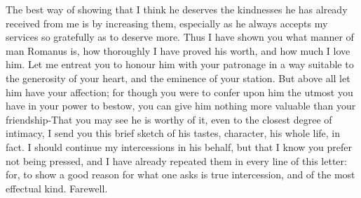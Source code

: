 The best way of showing that I think he deserves the kindnesses he has
already received from me is by increasing them, especially as he always
accepts my services so gratefully as to deserve more. Thus I have shown
you what manner of man Romanus is, how thoroughly I have proved his worth,
and how much I love him. Let me entreat you to honour him with your
patronage in a way suitable to the generosity of your heart, and the
eminence of your station. But above all let him have your affection; for
though you were to confer upon him the utmost you have in your power to
bestow, you can give him nothing more valuable than your friendship-That
you may see he is worthy of it, even to the closest degree of intimacy, I
send you this brief sketch of his tastes, character, his whole life, in
fact. I should continue my intercessions in his behalf, but that I know
you prefer not being pressed, and I have already repeated them in every
line of this letter: for, to show a good reason for what one asks is true
intercession, and of the most effectual kind. Farewell.


